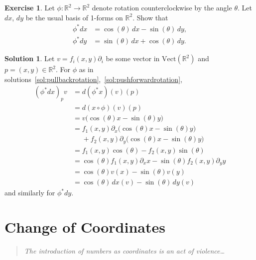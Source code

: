 \documentclass[11pt, a4paper]{report}
\theoremstyle{definition}
\newtheorem{ex}{Exercise}[part]
\newtheorem{sol}{Solution}[part]
\newenvironment{epigraph}
    {\begin{quote}\small\itshape} %
    {\end{quote}\ignorespacesafterend\vspace{\parskip}}
\begin{document}
\begin{ex}

Let $\phi: \mathbb{R}^2 \to \mathbb{R}^2$ denote rotation counterclockwise by the angle $\theta$. Let $dx$, $dy$ be the usual basis of 1-forms on $\mathbb{R}^2$. Show that
\begin{align*}
    \phi^* dx &= \cos(\theta) \, dx - \sin(\theta) \, dy, \\
    \phi^* dy &= \sin(\theta) \, dx + \cos(\theta) \, dy.
\end{align*}

\end{ex}

\begin{sol}

Let $v = f_i(x, y)\partial_i$ be some vector in $\text{Vect}(\mathbb{R}^2)$ and $p = (x, y) \in \mathbb{R}^2$. For $\phi$ as in solutions~\ref{sol:pullbackrotation},~\ref{sol:pushforwardrotation},
\begin{align*}
    {(\phi^* dx)}_p v &= d(\phi^* x)(v)(p) \\
        &= d(x \circ \phi)(v)(p) \\
        &= v \bigl( \cos(\theta) x - \sin(\theta) y \bigr) \\
        &= f_1(x, y) \partial_x \bigl( \cos(\theta) x - \sin(\theta) y \bigr) \\
        &\mathrel{\phantom{=}}{} + f_2(x, y) \partial_y \bigl( \cos(\theta) x
                                 - \sin(\theta) y \bigr) \\
        &= f_1(x, y) \cos(\theta) - f_2(x, y) \sin(\theta) \\
        &= \cos(\theta) f_1(x, y) \partial_x x
           - \sin(\theta) f_2(x, y) \partial_y y \\
        &= \cos(\theta) v(x) - \sin(\theta) v(y) \\
        &= \cos(\theta) \, dx(v) - \sin(\theta) \, dy(v)
\end{align*}
and similarly for $\phi^* dy$.

\end{sol}

\section{Change of Coordinates}

\begin{epigraph}
    The introduction of numbers as coordinates \textup{\textelp{}} is an act of violence\ldots
\end{epigraph}
\end{document}
